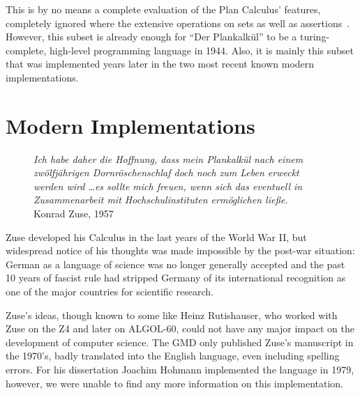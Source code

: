 \documentclass{llncs}
\begin{document}
 This is by no means a complete evaluation of the Plan Calculus' features, completely ignored where 
 the extensive operations on sets as well as assertions~\cite{zuse1948allgemeinen,epegmagHorstzuse}. 
 However, this subset is already enough for ``Der Plankalkül'' to be a turing-complete, high-level 
 programming language in 1944. Also, it is mainly this subset that was implemented years later in 
 the two most recent known modern implementations.
 \section{Modern Implementations}
 \begin{figure}[h!]
   \raggedright
   {\it Ich habe daher die Hoffnung, dass mein Plankalkül nach einem zwölfjährigen Dornröschenschlaf 
     doch noch zum Leben erweckt werden wird \dots es sollte mich freuen, wenn sich das eventuell in 
     Zusammenarbeit mit Hochschulinstituten ermöglichen ließe.}\\
   \raggedleft Konrad Zuse, 1957
   \label{fig:zuseQuoteDornroeschenschlaf}
 \end{figure}
 Zuse developed his Calculus in the last years of the World War II, but widespread notice of his
 thoughts was made impossible by the post-war situation: German as a language of science was no 
 longer generally accepted and the past 10 years of fascist rule had stripped Germany of its international 
 recognition as one of the major countries for scientific research.

 Zuse's ideas, though known to some like Heinz Rutishauser, who worked with Zuse on the Z4\cite{epegmagHorstzuse} and 
 later on ALGOL-60,
 could not have any major impact on the development of computer science. The GMD only published Zuse's
 manuscript in the 1970's, badly translated into the English language, even including spelling errors\cite{giloi2002konrad}.
 For his dissertation Joachim Hohmann implemented the language in 1979\cite{rojas2002konrad}, however, we were 
 unable to find any more information on this implementation.
\end{document}
